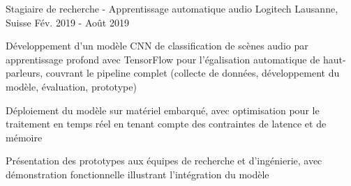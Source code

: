 \begin{cventries}
  \cventry
    {Stagiaire de recherche - Apprentissage automatique audio} %
    {Logitech} %
    {Lausanne, Suisse} %
    {Fév. 2019 - Août 2019} %
    {
      \begin{cvitems} %
        \item {Développement d'un modèle CNN de classification de scènes audio par apprentissage profond avec TensorFlow pour l'égalisation automatique de haut-parleurs, couvrant le pipeline complet (collecte de données, développement du modèle, évaluation, prototype)}
        \item {Déploiement du modèle sur matériel embarqué, avec optimisation pour le traitement en temps réel en tenant compte des contraintes de latence et de mémoire}
        \item {Présentation des prototypes aux équipes de recherche et d'ingénierie, avec démonstration fonctionnelle illustrant l'intégration du modèle}
      \end{cvitems}
    }

\end{cventries}

